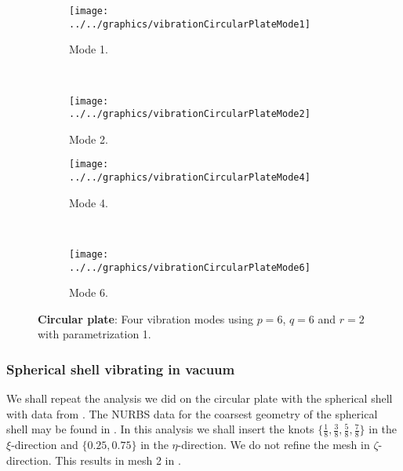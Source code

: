 \begin{figure}
	\centering        
	\begin{subfigure}{0.47\textwidth}
		\centering   
		\texttt{[image: ../../graphics/vibrationCircularPlateMode1]}
		\caption{Mode 1.}
	\end{subfigure}
	~
	\begin{subfigure}{0.47\textwidth}
		\centering   
		\texttt{[image: ../../graphics/vibrationCircularPlateMode2]}
		\caption{Mode 2.}
	\end{subfigure}
	\par\bigskip
	\begin{subfigure}{0.47\textwidth}
		\centering   
		\texttt{[image: ../../graphics/vibrationCircularPlateMode4]}
		\caption{Mode 4.}
	\end{subfigure}
	~ 
	\begin{subfigure}{0.47\textwidth}
		\centering   
		\texttt{[image: ../../graphics/vibrationCircularPlateMode6]}
		\caption{Mode 6.}
	\end{subfigure}
	\caption[Cibration modes of circular plate]{\textbf{Circular plate}: Four vibration modes using $p=6$, $q = 6$ and $r = 2$ with parametrization 1.}
	\label{Fig2:EigenModesCircularPlate}
\end{figure}

\subsubsection{Spherical shell vibrating in vacuum}
We shall repeat the analysis we did on the circular plate with the spherical shell with data from . The NURBS data for the coarsest geometry of the spherical shell may be found in . In this analysis we shall insert the knots $\{\frac{1}{8}, \frac{3}{8}, \frac{5}{8}, \frac{7}{8}\}$ in the $\xi$-direction and $\{0.25, 0.75\}$ in the $\eta$-direction. We do not refine the mesh in $\zeta$-direction. This results in mesh 2 in . 

